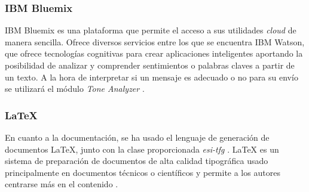 \documentclass{pre-tfg}
\begin{document}
\subsubsection*{IBM Bluemix}
IBM Bluemix es una plataforma que permite el acceso a sus utilidades \textit{cloud} de manera sencilla. Ofrece diversos servicios entre los que se encuentra IBM Watson, que ofrece tecnologías cognitivas para crear aplicaciones inteligentes aportando la posibilidad de analizar y comprender sentimientos o palabras claves a partir de un texto. A la hora de interpretar si un mensaje es adecuado o no para su envío se utilizará el módulo \textit{Tone Analyzer} \cite{IBM}.

\subsubsection*{LaTeX}
En cuanto a la documentación, se ha usado el lenguaje de generación de documentos \LaTeX{}, junto con la clase proporcionada \textit{esi-tfg} \cite{ARCO}. \LaTeX{} es un sistema de preparación de documentos de alta calidad tipográfica usado principalmente en documentos técnicos o científicos y permite a los autores centrarse más en el contenido \cite{TheLatexProject}.

\clearpage
\end{document}
